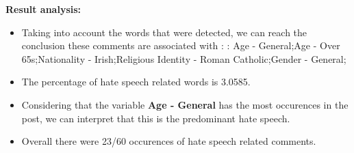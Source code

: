 \documentclass[11pt]{article}
\begin{document}
\textbf{\Large Result analysis:}

\begin{itemize}\item Taking into account the words that were detected, we can reach the conclusion these comments are associated with : : Age - General;Age - Over 65s;Nationality - Irish;Religious Identity - Roman Catholic;Gender - General;%

\item The percentage of hate speech related words is 3.0585.

\item Considering that the variable \textbf{Age - General} has the most occurences in the post, we can interpret that this is the predominant hate speech.

\item Overall there were 23/60 occurences of hate speech related comments.\end{itemize}
\end{document}
